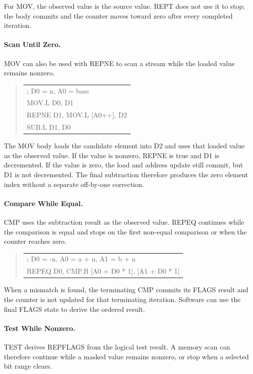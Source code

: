 For MOV, the observed value is the source value. REPT does not use it to stop;
the body commits and the counter moves toward zero after every completed
iteration.

\paragraph{Scan Until Zero.}
MOV can also be used with REPNE to scan a stream while the loaded value remains
nonzero.

\begin{quote}
\begingroup\small\ttfamily
\begin{tabular}{@{}l@{}}
; D0 = n, A0 = base\\
MOV.L D0, D1\\
REPNE D1, MOV.L [A0++], D2\\
SUB.L D1, D0\\
\end{tabular}
\endgroup
\end{quote}

The MOV body loads the candidate element into D2 and uses that loaded value as
the observed value. If the value is nonzero, REPNE is true and D1 is decremented.
If the value is zero, the load and address update still commit, but D1 is not
decremented. The final subtraction therefore produces the zero element index
without a separate off-by-one correction.

\paragraph{Compare While Equal.}
CMP uses the subtraction result as the observed value. REPEQ continues while the
comparison is equal and stops on the first non-equal comparison or when the
counter reaches zero.

\begin{quote}
\begingroup\small\ttfamily
\begin{tabular}{@{}l@{}}
; D0 = -n, A0 = a + n, A1 = b + n\\
REPEQ D0, CMP.B [A0 + D0 * 1], [A1 + D0 * 1]\\
\end{tabular}
\endgroup
\end{quote}

When a mismatch is found, the terminating CMP commits its FLAGS result and the
counter is not updated for that terminating iteration. Software can use the final
FLAGS state to derive the ordered result.

\paragraph{Test While Nonzero.}
TEST derives REPFLAGS from the logical test result. A memory scan can therefore
continue while a masked value remains nonzero, or stop when a selected bit range
clears.

